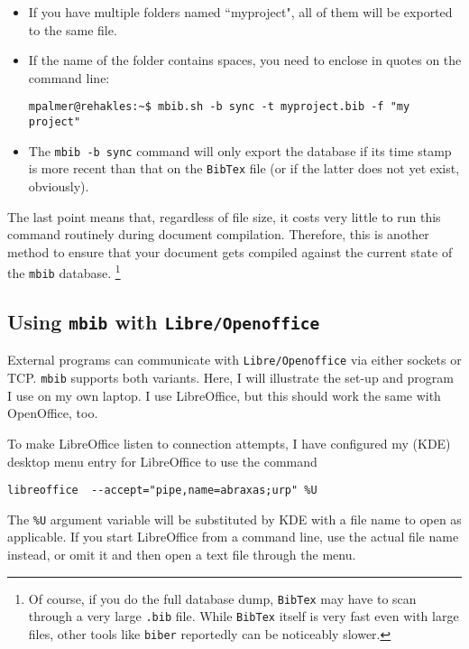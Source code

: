 \documentclass[10pt]{article}
\newcommand*{\mbib}{\texttt{mbib}\xspace}
\newcommand*{\loo}{\texttt{Libre\-/Open\-office}\xspace}
\newcommand*{\bibtex}{\texttt{BibTex}\xspace}
\begin{document}
\begin{itemize}
\item If you have multiple folders named ``myproject", all of them will be exported to the same file. 

\item If the name of the folder contains spaces, you need to enclose in quotes on the command line:

\begin{verbatim}
mpalmer@rehakles:~$ mbib.sh -b sync -t myproject.bib -f "my project"
\end{verbatim}

\item The \texttt{\mbib\ -b sync} command will only export the database if its time stamp is more recent than that on the \bibtex file (or if the latter does not yet exist, obviously). 

\end{itemize}

\noindent The last point means that, regardless of file size, it costs very little to run this command routinely during document compilation. Therefore, this is another method to ensure that your document gets compiled against the current state of the \mbib database.%
%
\footnote{Of course, if you do the full database dump, \bibtex may have to scan through a very large \texttt{.bib} file. While \bibtex itself is very fast even with large files, other tools like \texttt{biber} reportedly can be noticeably slower.}

\subsection{Using \mbib with \loo}

External programs can communicate with \loo via either sockets or TCP. \mbib supports both variants. Here, I will illustrate the set-up and program I use on my own laptop. I use LibreOffice, but this should work the same with OpenOffice, too. 

To make LibreOffice listen to connection attempts, I have configured my (KDE) desktop menu entry for LibreOffice to use the command

\begin{verbatim}
libreoffice  --accept="pipe,name=abraxas;urp" %U
\end{verbatim}

The \texttt{\%U} argument variable will be substituted by KDE with a file name to open as applicable. If you start LibreOffice from a command line, use the actual file name instead, or omit it and then open a text file through the menu. 
\end{document}
